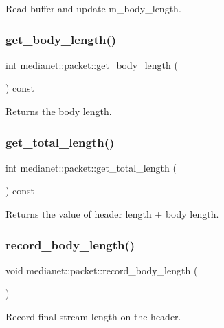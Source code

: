 Read buffer and update m\+\_\+body\+\_\+length. \mbox{\label{classmedianet_1_1packet_a46bbdb1b6bc78d9d20e3b79caf1f52a8}} 
\subsubsection{\texorpdfstring{get\_body\_length()}{get\_body\_length()}}
{\footnotesize\ttfamily int medianet\+::packet\+::get\+\_\+body\+\_\+length (\begin{DoxyParamCaption}{ }\end{DoxyParamCaption}) const}

Returns the body length. \mbox{\label{classmedianet_1_1packet_a2ad2bbbbc2652deb8e4e3bdb58c865c0}} 
\subsubsection{\texorpdfstring{get\_total\_length()}{get\_total\_length()}}
{\footnotesize\ttfamily int medianet\+::packet\+::get\+\_\+total\+\_\+length (\begin{DoxyParamCaption}{ }\end{DoxyParamCaption}) const}

Returns the value of header length + body length. \mbox{\label{classmedianet_1_1packet_a6eb933f4883b15aed43929d855bb1641}} 
\subsubsection{\texorpdfstring{record\_body\_length()}{record\_body\_length()}}
{\footnotesize\ttfamily void medianet\+::packet\+::record\+\_\+body\+\_\+length (\begin{DoxyParamCaption}{ }\end{DoxyParamCaption})}

Record final stream length on the header. 

